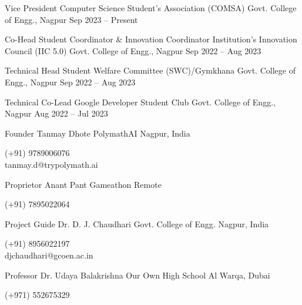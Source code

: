 \documentclass[11pt, a4paper]{awesome-cv}
\begin{document}

\begin{cventries}

\cventry
  {Vice President}
  {Computer Science Student's Association (COMSA)}
  {Govt. College of Engg., Nagpur}
  {Sep 2023 -- Present}
  {}

\cventry
  {Co-Head Student Coordinator \& Innovation Coordinator}
  {Institution's Innovation Council (IIC 5.0)}
  {Govt. College of Engg., Nagpur}
  {Sep 2022 -- Aug 2023}
  {}

\cventry
  {Technical Head}
  {Student Welfare Committee (SWC)/Gymkhana}
  {Govt. College of Engg., Nagpur}
  {Sep 2022 -- Aug 2023}
  {}

\cventry
  {Technical Co-Lead}
  {Google Developer Student Club}
  {Govt. College of Engg., Nagpur}
  {Aug 2022 -- Jul 2023}
  {}

\end{cventries}


\begin{cventries}

\cventry
  {Founder}
  {Tanmay Dhote}
  {PolymathAI}
  {Nagpur, India}
  {}
  \raggedright{\small\faMobile \hspace{4pt} (+91) 9789006076 \\
  \faEnvelope \hspace{4pt} tanmay.d@trypolymath.ai}

  \vskip 0.25cm

  \cventry
  {Proprietor}
  {Anant Pant}
  {Gameathon}
  {Remote}
  {}
  \raggedright{\small\faMobile \hspace{4pt} (+91) 7895022064 }
  
  \vskip 0.25cm

  \cventry
  {Project Guide}
  {Dr. D. J. Chaudhari}
  {Govt. College of Engg.}
  {Nagpur, India}
  {}
  \raggedright{\small\faMobile \hspace{4pt} (+91) 8956022197 \\
  \faEnvelope \hspace{4pt} djchaudhari@gcoen.ac.in}

  \vskip 0.25cm

  \cventry
  {Professor}
  {Dr. Udaya Balakrishna}
  {Our Own High School}
  {Al Warqa, Dubai}
  {}
  \raggedright{\small\faMobile \hspace{4pt} (+971) 552675329}
   


\end{cventries}
\end{document}
